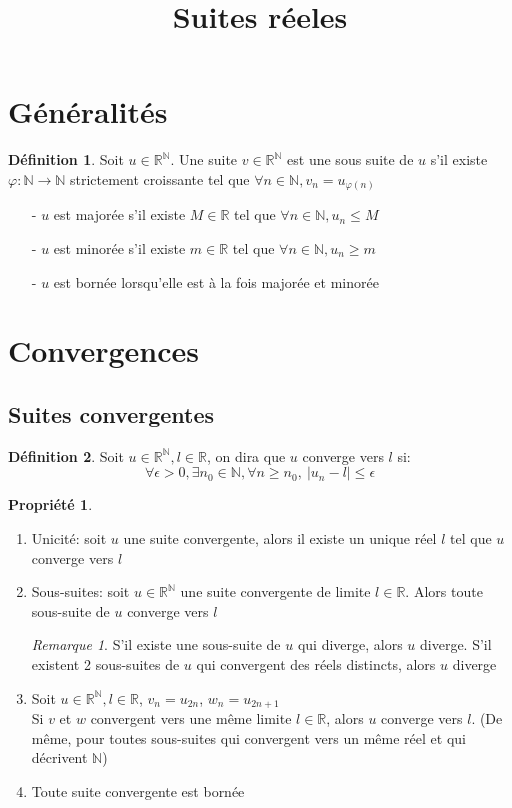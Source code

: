 \documentclass[fleqn]{article}
\title{Suites r\'eeles}
\date{}
\theoremstyle{definition} \newtheorem*{defi}{D\'efinition}
\theoremstyle{definition} \newtheorem*{theo}{Th\'eor\`eme}
\theoremstyle{definition} \newtheorem*{prop}{Propri\'et\'e}
\theoremstyle{definition} \newtheorem*{coro}{Corollaire}
\theoremstyle{remark} \newtheorem*{rqs}{Remarque}
\begin{document}
\maketitle

\section{G\'en\'eralit\'es}
\begin{defi}
		Soit $u \in \mathbb{R}^\mathbb{N}$. Une suite $v \in \mathbb{R}^\mathbb{N}$ est une sous suite de $u$ s'il existe
		$\varphi: \mathbb{N} \rightarrow \mathbb{N}$ strictement croissante tel que $\forall n \in \mathbb{N}, v_n = u_{\varphi(n)}$
\end{defi}
\begin{itemize}
	\item [-] $u$ est major\'ee s'il existe $M \in \mathbb{R}$ tel que $\forall n \in \mathbb{N}, u_n \leq M$
	\item [-] $u$ est minor\'ee s'il existe $m \in \mathbb{R}$ tel que $\forall n \in \mathbb{N}, u_n \geq m$
	\item [-] $u$ est born\'ee lorsqu'elle est \`a la fois major\'ee et minor\'ee
\end{itemize}

\section{Convergences}
\subsection{Suites convergentes}
\begin{defi}
	Soit $u \in \mathbb{R}^\mathbb{N}, l \in \mathbb{R}$, on dira que $u$ converge vers $l$ si:
	\[\forall \epsilon > 0, \exists n_0 \in \mathbb{N}, \forall n \geq n_0,\ |u_n - l| \leq \epsilon\]
\end{defi}

\begin{prop} $ $
	\begin{enumerate}
		\item Unicit\'e: soit $u$ une suite convergente, alors il existe un unique r\'eel $l$ tel que $u$ converge vers $l$
		\item Sous-suites: soit $u \in \mathbb{R}^\mathbb{N}$ une suite convergente de limite $l \in \mathbb{R}$. Alors toute sous-suite
		de $u$ converge vers $l$
		\begin{rqs}
			S'il existe une sous-suite de $u$ qui diverge, alors $u$ diverge. S'il existent 2 sous-suites de $u$ qui convergent des
			r\'eels distincts, alors $u$ diverge
		\end{rqs}
		\item Soit $u \in \mathbb{R}^\mathbb{N}, l \in \mathbb{R}$, $v_n = u_{2n}$, $w_n = u_{2n+1}$ \\
			Si $v$ et $w$ convergent vers une m\^eme limite $l \in \mathbb{R}$, alors $u$ converge vers $l$.
			(De m\^eme, pour toutes sous-suites qui convergent vers un m\^eme r\'eel et qui d\'ecrivent $\mathbb{N}$)
		\item Toute suite convergente  est born\'ee
	\end{enumerate}
\end{prop}
\end{document}
